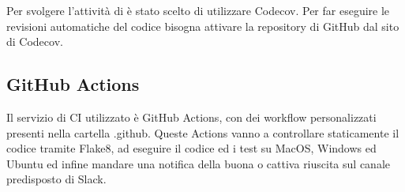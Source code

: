 Per svolgere l'attività di  è stato scelto di utilizzare Codecov. Per far eseguire le revisioni automatiche del codice bisogna attivare la repository di GitHub dal sito di Codecov.

\subsection{GitHub Actions}
Il servizio di CI utilizzato è GitHub Actions, con dei workflow personalizzati presenti nella cartella .github. Queste Actions vanno a controllare staticamente il codice tramite Flake8, ad eseguire il codice ed i test su MacOS, Windows ed Ubuntu ed infine mandare una notifica della buona o cattiva riuscita sul canale predisposto di Slack.